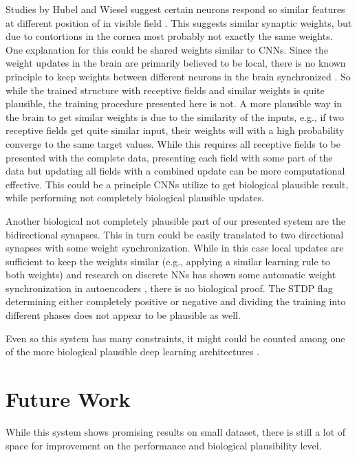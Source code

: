 Studies by Hubel and Wiesel suggest certain neurons respond so similar features at different position of in visible field \cite{Hubel1959}.
This suggests similar synaptic weights, but due to contortions in the cornea most probably not exactly the same weights. 
One explanation for this could be shared weights similar to CNNs. 
Since the weight updates in the brain are primarily believed to be local, there is no known principle to keep weights between different neurons in the brain synchronized \cite{DBLP:journals/corr/ScellierB16}.
So while the trained structure with receptive fields and similar weights is quite plausible, the training procedure presented here is not.
A more plausible way in the brain to get similar weights is due to the similarity of the inputs, e.g., if two receptive fields get quite similar input, their weights will with a high probability converge to the same target values.  
While this requires all receptive fields to be presented with the complete data, presenting each field with some part of the data but updating all fields with a combined update can be more computational effective. 
This could be a principle CNNs utilize to get biological plausible result, while performing not completely biological plausible updates.

Another biological not completely plausible part of our presented system are the bidirectional synapses.
This in turn could be easily translated to two directional synapses with some weight synchronization. 
While in this case local updates are sufficient to keep the weights similar (e.g., applying a similar learning rule to both weights) and research on discrete NNs has shown some automatic weight synchronization in autoencoders \cite{vincent2010stacked}, there is no biological proof.
The STDP flag determining either completely positive or negative and dividing the training into different phases does not appear to be plausible as well.

Even so this system has many constraints, it might could be counted among one of the more biological plausible deep learning architectures \cite{bengio2015towards}.     

\section{Future Work} \label{c:future}

While this system shows promising results on small dataset, there is still a lot of space for improvement on the performance and biological plausibility level.

